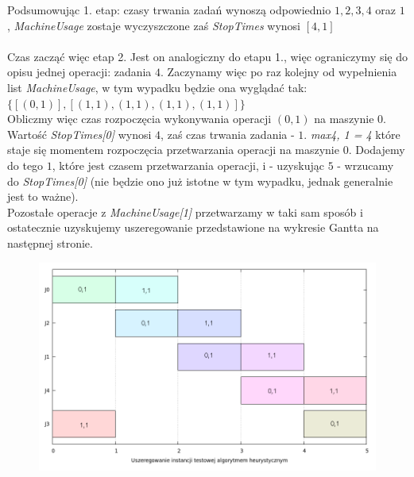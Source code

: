 \documentclass[a4paper,11pt]{article}
\begin{document}
Podsumowując 1. etap: czasy trwania zadań wynoszą odpowiednio $1, 2, 3, 4$ oraz $1$, \emph{MachineUsage} zostaje wyczyszczone zaś \emph{StopTimes} wynosi $[4,1]$
\\\\
Czas zacząć więc etap 2. Jest on analogiczny do etapu 1., więc ograniczymy się do opisu jednej operacji: zadania $4$. Zaczynamy więc po raz kolejny od wypełnienia list \emph{MachineUsage}, w tym wypadku będzie ona wyglądać tak:\\$\{[(0,1)],[(1,1),(1,1),(1,1),(1,1)]\}$\\
Obliczmy więc czas rozpoczęcia wykonywania operacji $(0,1)$ na maszynie $0$. Wartość \emph{StopTimes[0]} wynosi $4$, zaś czas trwania zadania - $1$. \emph{max{4, 1} = 4} które staje się momentem rozpoczęcia przetwarzania operacji na maszynie $0$. Dodajemy do tego $1$, które jest czasem przetwarzania operacji, i - uzyskując $5$ - wrzucamy do \emph{StopTimes[0]} (nie będzie ono już istotne w tym wypadku, jednak generalnie jest to ważne).\\
Pozostałe operacje z \emph{MachineUsage[1]} przetwarzamy w taki sam sposób i ostatecznie uzyskujemy uszeregowanie przedstawione na wykresie Gantta na następnej stronie.

\begin{figure}[!h]
\begin{center}
\includegraphics[scale=0.51]{images/gantt.png} \\
\end {center}
\end{figure}
\end{document}
